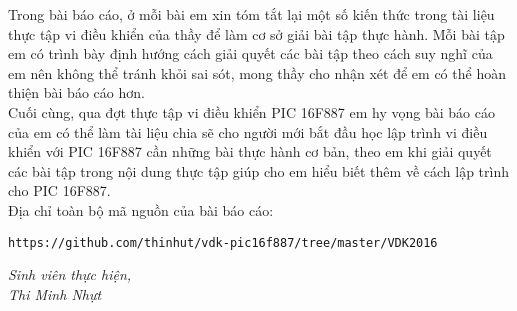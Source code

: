 Trong bài báo cáo, ở mỗi bài em xin tóm tắt lại một số kiến thức trong tài liệu thực tập vi điều khiển của thầy để làm cơ sở giải bài tập thực hành. Mỗi bài tập em có trình bày định hướng cách giải quyết các bài tập theo cách suy nghĩ của em nên không thể tránh khỏi sai sót, mong thầy cho nhận xét để em có thể hoàn thiện bài báo cáo hơn.\\

Cuối cùng, qua đợt thực tập vi điều khiển PIC 16F887 em hy vọng bài báo cáo của em có thể làm tài liệu chia sẽ cho người mới bắt đầu học lập trình vi điều khiển với PIC 16F887 cần những bài thực hành cơ bản, theo em khi giải quyết các bài tập trong nội dung thực tập giúp cho em hiểu biết thêm về cách lập trình cho PIC 16F887.\\

Địa chỉ toàn bộ mã nguồn của bài báo cáo:
\begin{center}
\verb|https://github.com/thinhut/vdk-pic16f887/tree/master/VDK2016|
\end{center}
\begin{flushright}
\textit{Sinh viên thực hiện,}\vspace{.5cm}\\
\textit{Thi Minh Nhựt}
\end{flushright}